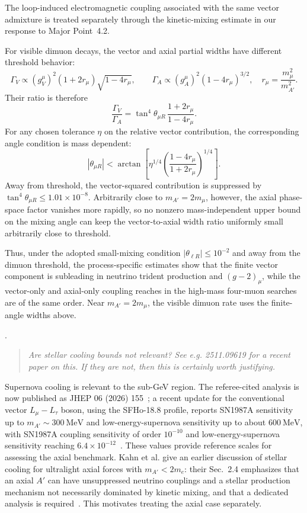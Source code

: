 \documentclass[12pt,a4paper]{article}
\begin{document}
The loop-induced electromagnetic coupling associated with the same vector admixture is treated separately through the kinetic-mixing estimate in our response to Major Point~4.2.

\medskip
{}

For visible dimuon decays, the vector and axial partial widths have different threshold behavior:
\[
\Gamma_V\propto(g_V^\mu)^2(1+2r_\mu)\sqrt{1-4r_\mu},\qquad
\Gamma_A\propto(g_A^\mu)^2(1-4r_\mu)^{3/2},
\quad r_\mu=\frac{m_\mu^2}{m_{A'}^2}.
\]
Their ratio is therefore
\[
\frac{\Gamma_V}{\Gamma_A}
=\tan^4\theta_{\mu R}\,
\frac{1+2r_\mu}{1-4r_\mu}.
\]
For any chosen tolerance \(\eta\) on the relative vector contribution, the corresponding angle condition is mass dependent:
\[
|\theta_{\mu R}|<
\arctan\!\left[
\eta^{1/4}
\left(\frac{1-4r_\mu}{1+2r_\mu}\right)^{1/4}
\right].
\]
Away from threshold, the vector-squared contribution is suppressed by \(\tan^4\theta_{\mu R}\leq1.01\times10^{-8}\). Arbitrarily close to \(m_{A'}=2m_\mu\), however, the axial phase-space factor vanishes more rapidly, so no nonzero mass-independent upper bound on the mixing angle can keep the vector-to-axial width ratio uniformly small arbitrarily close to threshold.

Thus, under the adopted small-mixing condition \(|\theta_{\ell R}|\leq10^{-2}\) and away from the dimuon threshold, the process-specific estimates show that the finite vector component is subleading in neutrino trident production and \((g-2)_\mu\), while the vector-only and axial-only coupling reaches in the high-mass four-muon searches are of the same order. Near \(m_{A'}=2m_\mu\), the visible dimuon rate uses the finite-angle widths above.

.
\begin{quote}\itshape
Are stellar cooling bounds not relevant? See e.g. 2511.09619 for a recent paper on this. If they are not, then this is certainly worth justifying.
\end{quote}


Supernova cooling is relevant to the sub-GeV region. The referee-cited analysis is now published as JHEP 06 (2026) 155~\cite{Blinov:2025aha}; a recent update for the conventional vector \(L_\mu-L_\tau\) boson, using the SFHo-18.8 profile, reports SN1987A sensitivity up to \(m_{A'}\sim300~\mathrm{MeV}\) and low-energy-supernova sensitivity up to about \(600~\mathrm{MeV}\), with SN1987A coupling sensitivity of order \(10^{-10}\) and low-energy-supernova sensitivity reaching \(6.4\times10^{-12}\)~\cite{Wang:2026supernova}. These values provide reference scales for assessing the axial benchmark. Kahn et al. give an earlier discussion of stellar cooling for ultralight axial forces with \(m_{A'}<2m_e\): their Sec.~2.4 emphasizes that an axial \(A'\) can have unsuppressed neutrino couplings and a stellar production mechanism not necessarily dominated by kinetic mixing, and that a dedicated analysis is required~\cite{Kahn:2016vjr}. This motivates treating the axial case separately.
\end{document}
